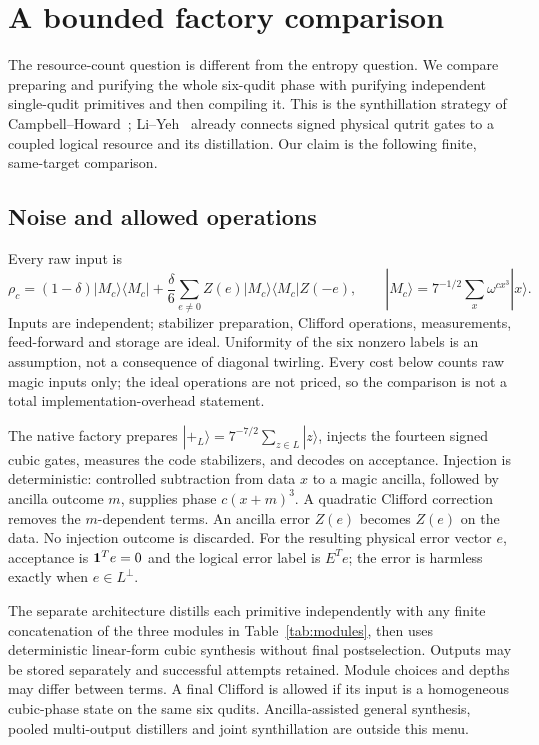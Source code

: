 \section{A bounded factory comparison}\label{sec:factory}
The resource-count question is different from the entropy question. We compare
preparing and purifying the whole six-qudit phase with purifying independent
single-qudit primitives and then compiling it. This is the synthillation
strategy of Campbell--Howard~\cite{campbellhoward}; Li--Yeh~\cite[Section 4.4
and Appendix C.1]{liyeh} already connects signed physical qutrit gates to a
coupled logical resource and its distillation. Our claim is the following
finite, same-target comparison.

\subsection{Noise and allowed operations}
Every raw input is
\begin{equation}\label{eq:noise}
 \rho_c=(1-\delta)|M_c\rangle\langle M_c|+
 \frac{\delta}{6}\sum_{e\ne0}Z(e)|M_c\rangle\langle M_c|Z(-e),
 \qquad |M_c\rangle=7^{-1/2}\sum_x\omega^{cx^3}|x\rangle.
\end{equation}
Inputs are independent; stabilizer preparation, Clifford operations,
measurements, feed-forward and storage are ideal. Uniformity of the six
nonzero labels is an assumption, not a consequence of diagonal twirling.
Every cost below counts raw magic inputs only; the ideal operations are not
priced, so the comparison is not a total implementation-overhead statement.

The native factory prepares $|+_L\rangle=7^{-7/2}\sum_{z\in L}|z\rangle$,
injects the fourteen signed cubic gates, measures the code stabilizers,
and decodes on acceptance. Injection is deterministic: controlled subtraction
from data $x$ to a magic ancilla, followed by ancilla outcome $m$, supplies
phase $c(x+m)^3$. A quadratic Clifford correction removes the $m$-dependent
terms. An ancilla error $Z(e)$ becomes $Z(e)$ on the data. No injection outcome
is discarded. For the resulting physical error vector $e$, acceptance is
$\mathbf 1^Te=0$ and the logical error label is $E^Te$; the error is harmless
exactly when $e\in L^\perp$.

The separate architecture distills each primitive independently with any
finite concatenation of the three modules in Table~\ref{tab:modules}, then
uses deterministic linear-form cubic synthesis without final postselection.
Outputs may be stored separately and successful attempts retained. Module
choices and depths may differ between terms. A final Clifford is allowed if
its input is a homogeneous cubic-phase state on the same six qudits.
Ancilla-assisted general synthesis, pooled multi-output distillers and joint
synthillation are outside this menu.

